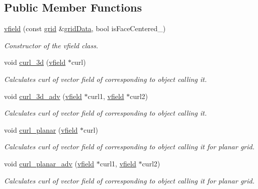 \subsection*{Public Member Functions}
\begin{DoxyCompactItemize}
\item 
\hyperlink{classvfield_a27ee08c3fd8e79d0afcaa80d63108264}{vfield} (const \hyperlink{classgrid}{grid} \&\hyperlink{classvfield_ae7bbaed334e2fc7840b45e4a89f408cc}{grid\+Data}, bool is\+Face\+Centered\+\_\+)
\begin{DoxyCompactList}\small\item\em Constructor of the vfield class. \end{DoxyCompactList}\item 
void \hyperlink{classvfield_aa4cc7ce34cee431cc2673a53bc8ab531}{curl\+\_\+3d} (\hyperlink{classvfield}{vfield} $\ast$curl)
\begin{DoxyCompactList}\small\item\em Calculates curl of vector field of corresponding to object calling it. \end{DoxyCompactList}\item 
void \hyperlink{classvfield_a8571bdf892c40c0b040a5d90da64ca4e}{curl\+\_\+3d\+\_\+adv} (\hyperlink{classvfield}{vfield} $\ast$curl1, \hyperlink{classvfield}{vfield} $\ast$curl2)
\begin{DoxyCompactList}\small\item\em Calculates curl of vector field of corresponding to object calling it. \end{DoxyCompactList}\item 
void \hyperlink{classvfield_aae68aee505a3274535d27ae66d298f86}{curl\+\_\+planar} (\hyperlink{classvfield}{vfield} $\ast$curl)
\begin{DoxyCompactList}\small\item\em Calculates curl of vector field of corresponding to object calling it for planar grid. \end{DoxyCompactList}\item 
void \hyperlink{classvfield_a86485536aa1a3eb0eea5da245c4aa90c}{curl\+\_\+planar\+\_\+adv} (\hyperlink{classvfield}{vfield} $\ast$curl1, \hyperlink{classvfield}{vfield} $\ast$curl2)
\begin{DoxyCompactList}\small\item\em Calculates curl of vector field of corresponding to object calling it for planar grid. \end{DoxyCompactList}\end{DoxyCompactItemize}
